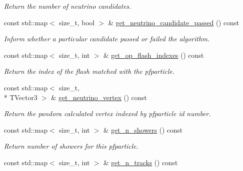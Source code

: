 \begin{DoxyCompactItemize}
\begin{DoxyCompactList}\small\item\em Return the number of neutrino candidates. \end{DoxyCompactList}\item 
const std\-::map$<$ size\-\_\-t, bool $>$ \& \hyperlink{classlee_1_1ElectronEventSelectionAlg_ab34dc2b97e0065b07a5233e3b46b83a4}{get\-\_\-neutrino\-\_\-candidate\-\_\-passed} () const 
\begin{DoxyCompactList}\small\item\em Inform whether a particular candidate passed or failed the algorithm. \end{DoxyCompactList}\item 
\hypertarget{classlee_1_1ElectronEventSelectionAlg_affda5b411008752c1355a9dd3a1d9c1e}{const std\-::map$<$ size\-\_\-t, int $>$ \& \hyperlink{classlee_1_1ElectronEventSelectionAlg_affda5b411008752c1355a9dd3a1d9c1e}{get\-\_\-op\-\_\-flash\-\_\-indexes} () const }\label{classlee_1_1ElectronEventSelectionAlg_affda5b411008752c1355a9dd3a1d9c1e}

\begin{DoxyCompactList}\small\item\em Return the index of the flash matched with the pfparticle. \end{DoxyCompactList}\item 
\hypertarget{classlee_1_1ElectronEventSelectionAlg_ac098d39d04f407c9bfc574da4b82fee6}{const std\-::map$<$ size\-\_\-t, \\*
T\-Vector3 $>$ \& \hyperlink{classlee_1_1ElectronEventSelectionAlg_ac098d39d04f407c9bfc574da4b82fee6}{get\-\_\-neutrino\-\_\-vertex} () const }\label{classlee_1_1ElectronEventSelectionAlg_ac098d39d04f407c9bfc574da4b82fee6}

\begin{DoxyCompactList}\small\item\em Return the pandora calculated vertex indexed by pfparticle id number. \end{DoxyCompactList}\item 
\hypertarget{classlee_1_1ElectronEventSelectionAlg_a43afa7fb8c10333f89774c6d4ea714dc}{const std\-::map$<$ size\-\_\-t, int $>$ \& \hyperlink{classlee_1_1ElectronEventSelectionAlg_a43afa7fb8c10333f89774c6d4ea714dc}{get\-\_\-n\-\_\-showers} () const }\label{classlee_1_1ElectronEventSelectionAlg_a43afa7fb8c10333f89774c6d4ea714dc}

\begin{DoxyCompactList}\small\item\em Return number of showers for this pfparticle. \end{DoxyCompactList}\item 
\hypertarget{classlee_1_1ElectronEventSelectionAlg_ad24d64eca5e56d0550572b24d5e213f7}{const std\-::map$<$ size\-\_\-t, int $>$ \& \hyperlink{classlee_1_1ElectronEventSelectionAlg_ad24d64eca5e56d0550572b24d5e213f7}{get\-\_\-n\-\_\-tracks} () const }\label{classlee_1_1ElectronEventSelectionAlg_ad24d64eca5e56d0550572b24d5e213f7}


\end{DoxyCompactItemize}
